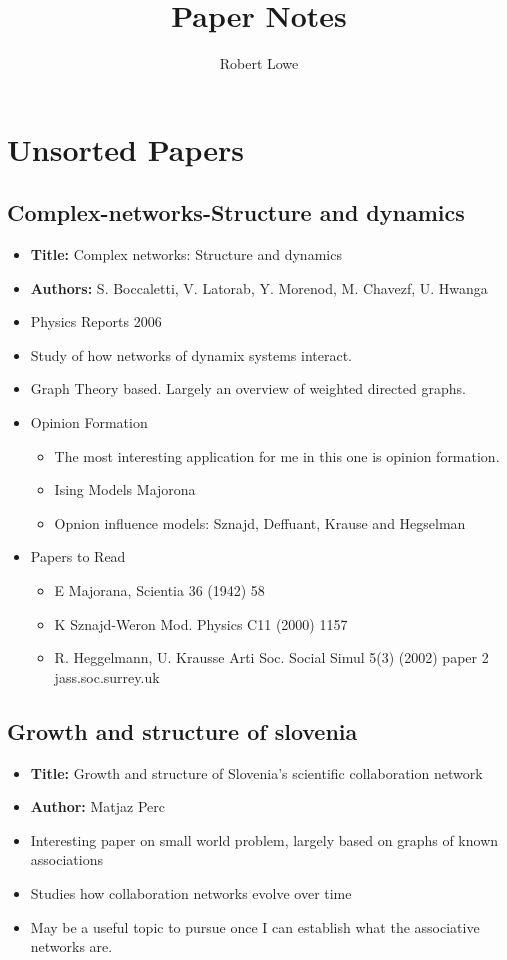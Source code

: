 \documentclass{article}
\title{Paper Notes}
\author{Robert Lowe}
\begin{document}
\maketitle

\section{Unsorted Papers}

\subsection{Complex-networks-Structure and dynamics}
\begin{itemize}
  \item {\bf Title:} Complex networks: Structure and dynamics
  \item {\bf Authors:} S. Boccaletti, V. Latorab, Y. Morenod, M. Chavezf, U. Hwanga
  \item Physics Reports 2006
  \item Study of how networks of dynamix systems interact.
  \item Graph Theory based.  Largely an overview of weighted directed graphs.
  \item Opinion Formation
  \begin{itemize}
    \item The most interesting application for me in this one is opinion formation.
    \item Ising Models Majorona
    \item Opnion influence models: Sznajd, Deffuant, Krause and Hegselman
  \end{itemize}
  \item Papers to Read
  \begin{itemize}
    \item E Majorana, Scientia 36 (1942) 58
    \item K Sznajd-Weron Mod. Physics C11 (2000) 1157
    \item R. Heggelmann, U. Krausse Arti Soc. Social Simul 5(3) (2002) paper
    2 jass.soc.surrey.uk    
  \end{itemize}
\end{itemize}

\subsection{Growth and structure of slovenia }
\begin{itemize}
  \item{\bf Title:} Growth and structure of Slovenia’s scientific collaboration network
  \item{\bf Author:} Matjaz Perc
  \item Interesting paper on small world problem, largely based on graphs of known associations
  \item Studies how collaboration networks evolve over time
  \item May be a useful topic to pursue once I can establish what the associative networks are.
\end{itemize}
\end{document}

